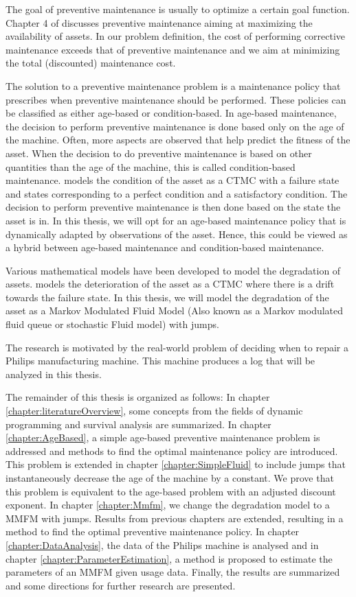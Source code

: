 \documentclass[a4paper]{thesis}
\theoremstyle{definition}
\begin{document}
The goal of preventive maintenance is usually to optimize a certain goal function.
Chapter 4 of \cite{Zacks2012} discusses preventive maintenance aiming at maximizing the availability of assets.
In our problem definition, the cost of performing corrective maintenance exceeds that of preventive maintenance and we aim at minimizing the total (discounted) maintenance cost.

The solution to a preventive maintenance problem is a maintenance policy that prescribes when preventive maintenance should be performed.
These policies can be classified as either age-based or condition-based.
In age-based maintenance, the decision to perform preventive maintenance is done based only on the age of the machine.
Often, more aspects are observed that help predict the fitness of the asset.
When the decision to do preventive maintenance is based on other quantities than the age of the machine, this is called condition-based maintenance.
\cite{Kalosi2016} models the condition of the asset as a CTMC with a failure state and states corresponding to a perfect condition and a satisfactory condition.
The decision to perform preventive maintenance is then done based on the state the asset is in.
In this thesis, we will opt for an age-based maintenance policy that is dynamically adapted by observations of the asset.
Hence, this could be viewed as a hybrid between age-based maintenance and condition-based maintenance.

Various mathematical models have been developed to model the degradation of assets.
\cite{Derman1963} models the deterioration of the asset as a CTMC where there is a drift towards the failure state.
In this thesis, we will model the degradation of the asset as a Markov Modulated Fluid Model (Also known as a Markov modulated fluid queue or stochastic Fluid model) with jumps.

The research is motivated by the real-world problem of deciding when to repair a Philips manufacturing machine.
This machine produces a log that will be analyzed in this thesis.

The remainder of this thesis is organized as follows:
In chapter \ref{chapter:literatureOverview}, some concepts from the fields of dynamic programming and survival analysis are summarized.  
In chapter \ref{chapter:AgeBased}, a simple age-based preventive maintenance problem is addressed and methods to find the optimal maintenance policy are introduced.
This problem is extended in chapter \ref{chapter:SimpleFluid} to include jumps that instantaneously decrease the age of the machine by a constant.
We prove that this problem is equivalent to the age-based problem with an adjusted discount exponent.
In chapter \ref{chapter:Mmfm}, we change the degradation model to a MMFM with jumps.
Results from previous chapters are extended, resulting in a method to find the optimal preventive maintenance policy.
In chapter \ref{chapter:DataAnalysis}, the data of the Philips machine is analysed and in chapter \ref{chapter:ParameterEstimation}, a method is proposed to estimate the parameters of an MMFM given usage data.
Finally, the results are summarized and some directions for further research are presented.
\end{document}
